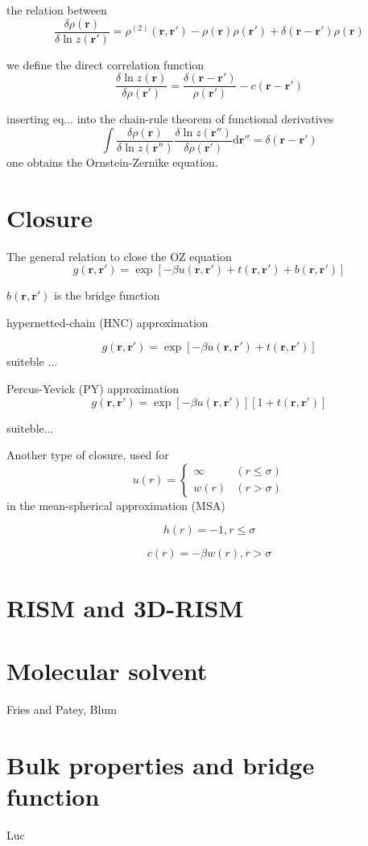 the relation between
\[
\frac{\delta\rho(\mathbf{r})}{\delta\ln z(\mathbf{r}')}=\rho^{(2)}(\mathbf{r},\mathbf{r}')-\rho(\mathbf{r})\rho(\mathbf{r}')+\delta(\mathbf{r}-\mathbf{r}')\rho(\mathbf{r})
\]


we define the direct correlation function
\[
\frac{\delta\ln z(\mathbf{r})}{\delta\rho(\mathbf{r}')}=\frac{\delta(\mathbf{r}-\mathbf{r}')}{\rho(\mathbf{r}')}-c(\mathbf{r}-\mathbf{r}')
\]


inserting eq... into the chain-rule theorem of functional derivatives
\[
\int\frac{\delta\rho(\mathbf{r})}{\delta\ln z(\mathbf{r}'')}\frac{\delta\ln z(\mathbf{r}'')}{\delta\rho(\mathbf{r}')}\mathrm{d}\mathbf{r}''=\delta(\mathbf{r}-\mathbf{r}')
\]
one obtains the Ornstein-Zernike equation.


\section{Closure}

The general relation to close the OZ equation
\begin{equation}
g(\mathbf{r},\mathbf{r}')=\exp\left[-\beta u(\mathbf{r},\mathbf{r}')+t(\mathbf{r},\mathbf{r}')+b(\mathbf{r},\mathbf{r}')\right]
\end{equation}


$b(\mathbf{r},\mathbf{r}')$ is the bridge function

hypernetted-chain (HNC) approximation

\begin{equation}
g(\mathbf{r},\mathbf{r}')=\exp\left[-\beta u(\mathbf{r},\mathbf{r}')+t(\mathbf{r},\mathbf{r}')\right]
\end{equation}
suiteble ...

Percus-Yevick (PY) approximation
\begin{equation}
g(\mathbf{r},\mathbf{r}')=\exp\left[-\beta u(\mathbf{r},\mathbf{r}')\right]\left[1+t(\mathbf{r},\mathbf{r}')\right]
\end{equation}


suiteble...

Another type of closure, used for 
\[
u(r)=\begin{cases}
\infty & (r\leq\sigma)\\
w(r) & (r>\sigma)
\end{cases}
\]
in the mean-spherical approximation (MSA)

\[
h(r)=-1,r\leq\sigma
\]


\[
c(r)=-\beta w(r),r>\sigma
\]



\section{RISM and 3D-RISM}


\section{Molecular solvent}

Fries and Patey, Blum


\section{Bulk properties and bridge function}

Luc

